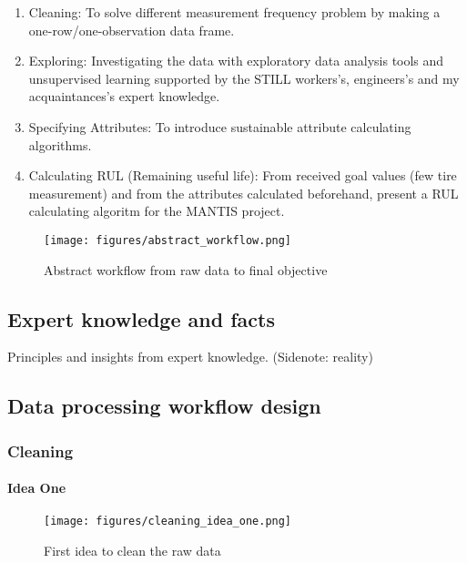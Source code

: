 \begin{enumerate}
	\item {Cleaning:} To solve different measurement frequency problem by making a one-row/one-observation data frame.
	\item {Exploring:} Investigating the data with exploratory data analysis tools and unsupervised learning supported by the STILL workers's, engineers's and my acquaintances's expert knowledge.
 	\item {Specifying Attributes:} To introduce sustainable attribute calculating algorithms.
 	\item {Calculating RUL (Remaining useful life):} From received goal values (few tire measurement) and from the attributes calculated beforehand, present a RUL calculating algoritm for the MANTIS project.
\end{enumerate}

\begin{figure}[!ht]
\centering
\texttt{[image: figures/abstract\_workflow.png]}
\caption{Abstract workflow from raw data to final objective} 
\end{figure}

\subsection{Expert knowledge and facts}
Principles and insights from expert knowledge.
(Sidenote: reality)
\subsection{Data processing workflow design}
\cite{CSDISTILLED}
\cite{DATACAMP}	
\cite{LeanThinking}
	\subsubsection{Cleaning}
		\paragraph{Idea One}
			\begin{figure}[!ht]
			\centering
			\texttt{[image: figures/cleaning\_idea\_one.png]}
			\caption{First idea to clean the raw data} 
			\end{figure}
